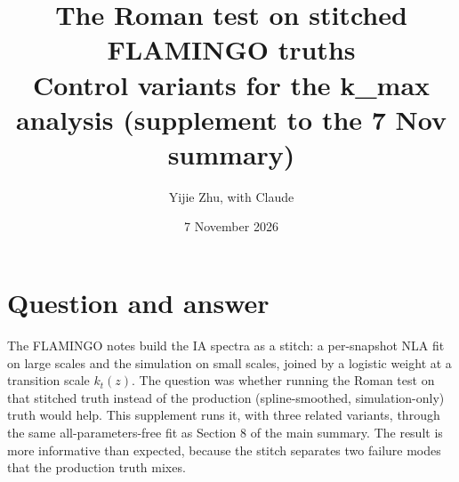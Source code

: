 \documentclass[11pt]{article}
\title{The Roman test on stitched FLAMINGO truths\\[2pt]\large Control variants for the k\_max analysis (supplement to the 7 Nov summary)}
\author{Yijie Zhu, with Claude}
\date{7 November 2026}
\begin{document}
\maketitle

\section*{Question and answer}

The FLAMINGO notes build the IA spectra as a stitch: a per-snapshot NLA fit
on large scales and the simulation on small scales, joined by a logistic
weight at a transition scale $k_t(z)$. The question was whether running the
Roman test on that stitched truth instead of the production
(spline-smoothed, simulation-only) truth would help. This supplement runs
it, with three related variants, through the same all-parameters-free fit
as Section 8 of the main summary. The result is more informative than
expected, because the stitch separates two failure modes that the
production truth mixes.
\end{document}
